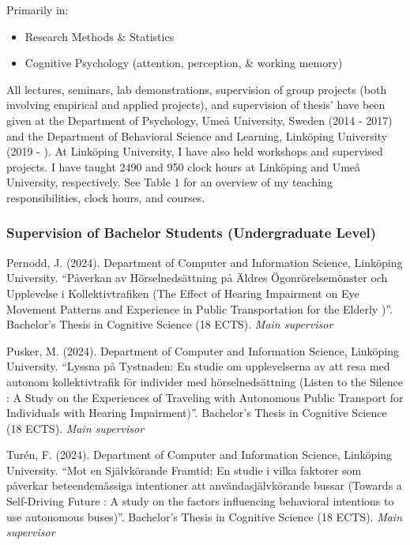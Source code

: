 \documentclass[]{article}
\providecommand{\tightlist}{%
  \setlength{\itemsep}{0pt}\setlength{\parskip}{0pt}}
\begin{document}
Primarily in:

\begin{itemize}
\tightlist
\item
  Research Methods \& Statistics
\item
  Cognitive Psychology (attention, perception, \& working memory)
\end{itemize}

All lectures, seminars, lab demonstrations, supervision of group
projects (both involving empirical and applied projects), and
supervision of thesis' have been given at the Department of Psychology,
Umeå University, Sweden (2014 - 2017) and the Department of Behavioral
Science and Learning, Linköping University (2019 - ). At Linköping
University, I have also held workshops and supervised projects. I have
taught 2490 and 950 clock hours at Linköping and Umeå University,
respectively. See Table 1 for an overview of my teaching
responsibilities, clock hours, and courses.

\subsubsection{Supervision of Bachelor Students (Undergraduate
Level)}\label{supervision-of-bachelor-students-undergraduate-level}

Pernodd, J. (2024). Department of Computer and Information Science,
Linköping University. ``Påverkan av Hörselnedsättning på Äldres
Ögonrörelsemönster och Upplevelse i Kollektivtrafiken (The Effect of
Hearing Impairment on Eye Movement Patterns and Experience in Public
Transportation for the Elderly )''. Bachelor's Thesis in Cognitive
Science (18 ECTS). \emph{Main supervisor}

Pusker, M. (2024). Department of Computer and Information Science,
Linköping University. ``Lyssna på Tystnaden: En studie om upplevelserna
av att resa med autonom kollektivtrafik för individer med
hörselnedsättning (Listen to the Silence : A Study on the Experiences of
Traveling with Autonomous Public Transport for Individuals with Hearing
Impairment)''. Bachelor's Thesis in Cognitive Science (18 ECTS).
\emph{Main supervisor}

Turén, F. (2024). Department of Computer and Information Science,
Linköping University. ``Mot en Självkörande Framtid: En studie i vilka
faktorer som påverkar beteendemässiga intentioner att
användasjälvkörande bussar (Towards a Self-Driving Future : A study on
the factors influencing behavioral intentions to use autonomous
buses)''. Bachelor's Thesis in Cognitive Science (18 ECTS). \emph{Main
supervisor}
\end{document}
